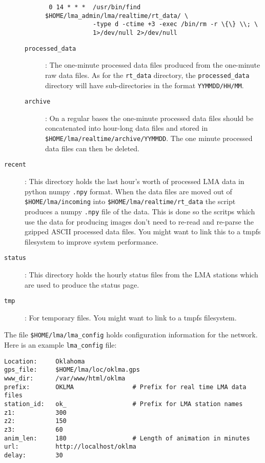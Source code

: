 \documentclass[12pt]{article}
\begin{document}
\begin{description}
\begin{description}
\verb? 0 14 * * *  /usr/bin/find $HOME/lma_admin/lma/realtime/rt_data/ \? \\
\verb?             -type d -ctime +3 -exec /bin/rm -r \{\} \\; \? \\
\verb?             1>/dev/null 2>/dev/null?

\item [{\tt processed\_data}]:  The one-minute processed data files produced from the
one-minute raw data files.  As for the {\tt rt\_data} directory, the {\tt processed\_data}
directory will have sub-directories in the format {\tt YYMMDD/HH/MM}.  
\item [{\tt archive}]:  On a regular bases the one-minute processed data files should be
concatenated into hour-long data files and stored in {\tt
\$HOME/lma/realtime/archive/YYMMDD}.  The one minute processed data files can then be
deleted.
\end{description}


\item [{\tt recent}]:  This directory holds the last hour's worth of processed LMA data in python
numpy {\tt .npy} format.  When the data files are moved out of {\tt \$HOME/lma/incoming}
into {\tt \$HOME/lma/realtime/rt\_data} the script produces a numpy {\tt .npy} file of the
data.  This is done so the scritps which use the data for producing images don't need to
re-read and re-parse the gzipped ASCII processed data files.  You might want to link this to a tmpfs filesystem 
to improve system performance.

\item [{\tt status}]:  This directory holds the hourly status files from the LMA stations
which are used to produce the status page.

\item [{\tt tmp}]:  For temporary files.  You might want to link to a tmpfs filesystem.

\end{description}

The file {\tt \$HOME/lma/lma\_config} holds configuration information for the network. Here
is an example {\tt lma\_config} file:

\begin{verbatim}
Location:     Oklahoma
gps_file:     $HOME/lma/loc/oklma.gps
www_dir:      /var/www/html/oklma
prefix:       OKLMA                # Prefix for real time LMA data files
station_id:   ok_                  # Prefix for LMA station names
z1:           300
z2:           150
z3:           60
anim_len:     180                  # Length of animation in minutes
url:          http://localhost/oklma
delay:        30
\end{verbatim}
\end{document}
